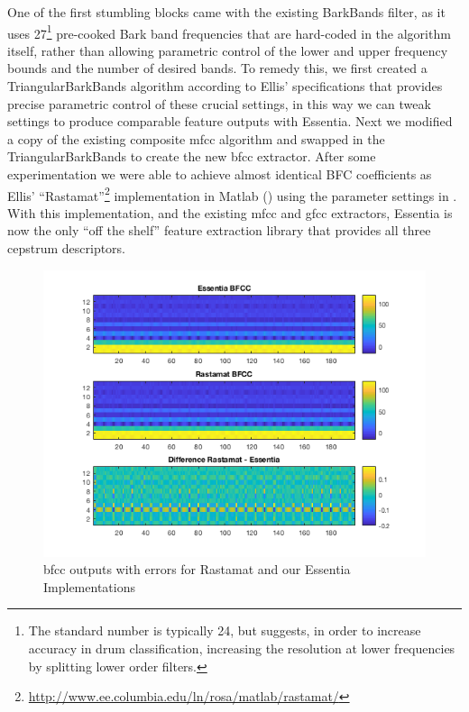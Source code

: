 {{{{One of the first stumbling blocks came with the existing BarkBands filter, as it uses 27\footnote{The standard number is typically 24, but \cite{Herrera2003} suggests, in order to increase accuracy in drum classification, increasing the resolution at lower frequencies by splitting lower order filters.} pre-cooked Bark band frequencies that are hard-coded in the algorithm itself, rather than allowing parametric control of the lower and upper frequency bounds and the number of desired bands. To remedy this, we first created a TriangularBarkBands algorithm according to Ellis' specifications that provides precise parametric control of these crucial settings, in this way we can tweak settings to produce comparable feature outputs with Essentia. Next we modified a copy of the existing composite \acrshort{mfcc} algorithm and swapped in the TriangularBarkBands to create the new \acrshort{bfcc} extractor. After some experimentation we were able to achieve almost identical BFC coefficients as Ellis' ``Rastamat''\footnote{\url{http://www.ee.columbia.edu/ln/rosa/matlab/rastamat/}} implementation in Matlab () using the parameter settings in . With this implementation, and the existing \acrshort{mfcc} and \acrshort{gfcc} extractors, Essentia is now the only ``off the shelf'' feature extraction library that provides all three cepstrum descriptors.

\begin{figure}
	\begin{center}
		\includegraphics[width=1.0\textwidth]{ch05_pyconcat/figures/matlab_bark.png}
	\end{center}
	\caption[BFCC outputs with errors for Rastamat and our Essentia Implementations]{\acrshort{bfcc} outputs with errors for Rastamat and our Essentia Implementations}
	\label{fig:matlab_bark}
\end{figure}

}}}}
